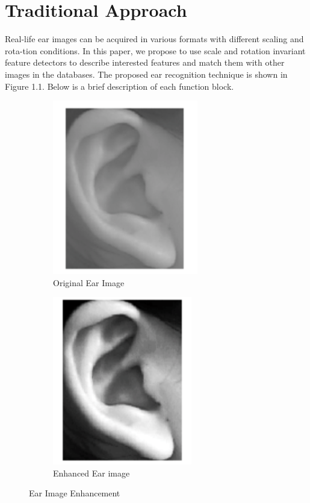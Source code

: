 \section{Traditional Approach} 
Real-life ear images can be acquired in various formats with different scaling and rota-tion conditions. In this paper, we propose to use scale and rotation invariant feature detectors to describe interested features and match them with other images in the databases. The proposed ear recognition technique is shown in Figure 1.1. Below is a brief description of each function block.


\begin{figure}
\centering
\begin{subfigure}{.5\textwidth}
  \centering
  \includegraphics[width=.4\linewidth]{Figures/Figure3}
  \caption{Original Ear Image}
  \label{fig:sub1}
\end{subfigure}%
\begin{subfigure}{.5\textwidth}
  \centering
  \includegraphics[width=.4\linewidth]{Figures/Figure4}
  \caption{Enhanced Ear image}
  \label{fig:sub2}
\end{subfigure}
\caption{Ear Image Enhancement}
\label{fig:test1}
\end{figure}

